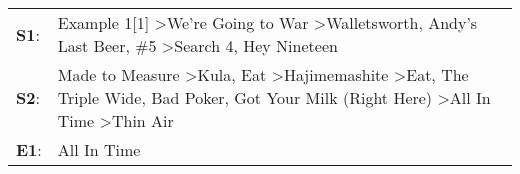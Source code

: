 \begin{supertabular}{p{0.03\textwidth}p{0.92\textwidth}}
 \textbf{S1}:  &                                                                                                                                           Example 1[1]\textsuperscript{} \textgreater \enspace We're Going to War\textsuperscript{} \textgreater \enspace Walletsworth\textsuperscript{}, \enspace Andy's Last Beer\textsuperscript{}, \enspace \#5\textsuperscript{} \textgreater \enspace Search 4\textsuperscript{}, \enspace Hey Nineteen\textsuperscript{}  \enspace  \\
 \textbf{S2}:  &  Made to Measure\textsuperscript{} \textgreater \enspace Kula\textsuperscript{}, \enspace Eat\textsuperscript{} \textgreater \enspace Hajimemashite\textsuperscript{} \textgreater \enspace Eat\textsuperscript{}, \enspace The Triple Wide\textsuperscript{}, \enspace Bad Poker\textsuperscript{}, \enspace Got Your Milk (Right Here)\textsuperscript{} \textgreater \enspace All In Time\textsuperscript{} \textgreater \enspace Thin Air\textsuperscript{}  \enspace  \\
 \textbf{E1}:  &                                                                                                                                                                                                                                                                                                                                                                                                                                   All In Time\textsuperscript{}  \enspace  \\
\end{supertabular}
